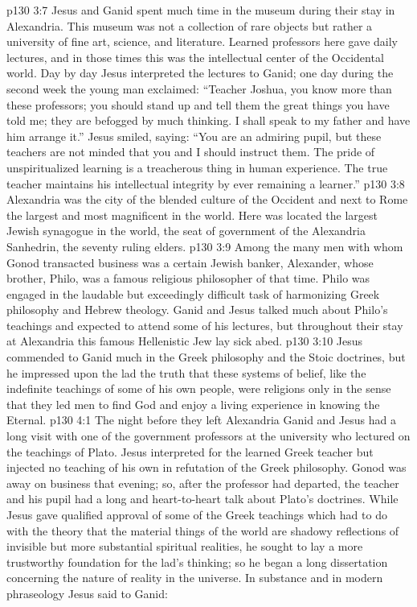 \pc \vs p130 3:7 Jesus and Ganid spent much time in the museum during their stay in Alexandria. This museum was not a collection of rare objects but rather a university of fine art, science, and literature. Learned professors here gave daily lectures, and in those times this was the intellectual center of the Occidental world. Day by day Jesus interpreted the lectures to Ganid; one day during the second week the young man exclaimed: “Teacher Joshua, you know more than these professors; you should stand up and tell them the great things you have told me; they are befogged by much thinking. I shall speak to my father and have him arrange it.” Jesus smiled, saying: \textcolor{ubdarkred}{“You are an admiring pupil, but these teachers are not minded that you and I should instruct them. The pride of unspiritualized learning is a treacherous thing in human experience. The true teacher maintains his intellectual integrity by ever remaining a learner.”}
\vs p130 3:8 Alexandria was the city of the blended culture of the Occident and next to Rome the largest and most magnificent in the world. Here was located the largest Jewish synagogue in the world, the seat of government of the Alexandria Sanhedrin, the seventy ruling elders.
\vs p130 3:9 Among the many men with whom Gonod transacted business was a certain Jewish banker, Alexander, whose brother, Philo, was a famous religious philosopher of that time. Philo was engaged in the laudable but exceedingly difficult task of harmonizing Greek philosophy and Hebrew theology. Ganid and Jesus talked much about Philo’s teachings and expected to attend some of his lectures, but throughout their stay at Alexandria this famous Hellenistic Jew lay sick abed.
\vs p130 3:10 Jesus commended to Ganid much in the Greek philosophy and the Stoic doctrines, but he impressed upon the lad the truth that these systems of belief, like the indefinite teachings of some of his own people, were religions only in the sense that they led men to find God and enjoy a living experience in knowing the Eternal.
\vs p130 4:1 The night before they left Alexandria Ganid and Jesus had a long visit with one of the government professors at the university who lectured on the teachings of Plato. Jesus interpreted for the learned Greek teacher but injected no teaching of his own in refutation of the Greek philosophy. Gonod was away on business that evening; so, after the professor had departed, the teacher and his pupil had a long and heart\hyp{}to\hyp{}heart talk about Plato’s doctrines. While Jesus gave qualified approval of some of the Greek teachings which had to do with the theory that the material things of the world are shadowy reflections of invisible but more substantial spiritual realities, he sought to lay a more trustworthy foundation for the lad’s thinking; so he began a long dissertation concerning the nature of reality in the universe. In substance and in modern phraseology Jesus said to Ganid:
